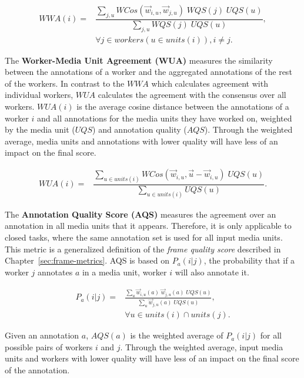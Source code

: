 \begin{align}
 WWA(i) = & \dfrac{ \sum\limits_{j, u} WCos(\vec{w}_{i,u} , \vec{w}_{j,u}) \; WQS(j) \; UQS(u) }{ \sum\limits_{j, u} WQS(j) \; UQS(u) }, \\
& \forall j \in workers(u \in units(i)), i \neq j . \nonumber
\end{align}

The \textbf{Worker-Media Unit Agreement (WUA)} measures the similarity between the annotations of a worker and the aggregated annotations of the rest of the workers. In contrast to the $WWA$ which calculates agreement with individual workers, $WUA$ calculates the agreement with the consensus over all workers. $WUA(i)$ is the average cosine distance between the annotations of a worker $i$ and all annotations for the media units they have worked on, weighted by the media unit ($UQS$) and annotation quality ($AQS$). Through the weighted average, media units and annotations with lower quality will have less of an impact on the final score.

\begin{align}
WUA(i) = & \dfrac{\sum\limits_{u \in units(i)} WCos(\vec{w}_{i,u} , \vec{u} - \vec{w}_{i,u}) \; UQS(u)}{\sum\limits_{u \in units(i)} UQS(u)}.
\end{align}

The \textbf{Annotation Quality Score (AQS)} measures the agreement over an annotation in all media units that it appears. Therefore, it is only applicable to closed tasks, where the same annotation set is used for all input media units. This metric is a generalized definition of the \textit{frame quality score} described in Chapter~\ref{sec:frame-metrics}. AQS is based on $P_a(i | j)$, the probability that if a worker $j$ annotates $a$ in a media unit, worker $i$ will also annotate it.

\begin{align}
P_a(i | j) = & \frac{ \sum\limits_{u} \vec{w}_{i,u}(a) \; \vec{w}_{j,u}(a) \; UQS(u)}{ \sum\limits_{u} \vec{w}_{j, u}(a) \;  UQS(u) }, \\
& \forall u \in units(i) \cap units(j). \nonumber
\end{align}

Given an annotation $a$, $AQS(a)$ is the weighted average of $P_a(i | j)$ for all possible pairs of workers $i$ and $j$. Through the weighted average, input media units and workers with lower quality will have less of an impact on the final score of the annotation.

